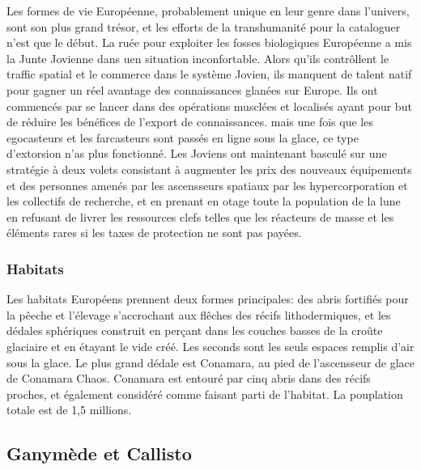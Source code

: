                                                                Les formes de vie Européenne, probablement unique en leur genre dans l'univers, sont son plus grand trésor, et les efforts de la transhumanité pour la cataloguer n'est que le début. La ruée pour exploiter les fosses biologiques Européenne a mis la Junte Jovienne dans uen situation inconfortable. Alors qu'ils contrôllent le traffic spatial et le commerce dans le système Jovien, ils manquent de talent natif pour gagner un réel avantage des connaissances glanées sur Europe. Ils ont commencés par se lancer dans des opérations musclées et localisés ayant pour but de réduire les bénéfices de l'export de connaissances. mais une fois que les egocasteurs et les farcasteurs sont passés en ligne sous la glace, ce type d'extorsion n'as plus fonctionné. Les Joviens ont maintenant basculé sur une stratégie à deux volets consistant à augmenter les prix des nouveaux équipements et des personnes amenés par les ascensseurs spatiaux par les hypercorporation et les collectifs de recherche, et en prenant en otage toute la population de la lune en refusant de livrer les ressources clefs telles que les réacteurs de masse et les éléments rares si les taxes de protection ne sont pas payées. 

                                                               \subsubsection{Habitats} \label{sec:habitats-4} 

                                                               Les habitats Européens prennent deux formes principales: des abris fortifiés pour la pêeche et l'élevage s'accrochant aux flêches des récifs lithodermiques, et les dédales sphériques construit en perçant dans les couches basses de la croûte glaciaire et en étayant le vide créé. Les seconds sont les seuls espaces remplis d'air sous la glace. Le plus grand dédale est Conamara, au pied de l'ascensseur de glace de Conamara Chaos. Conamara est entouré par cinq abris dans des récifs proches, et également considéré comme faisant parti de l'habitat. La pouplation totale est de 1,5 millions. 

                                                               \subsection{Ganymède et Callisto} \label{sec:ganymede-callisto} 

